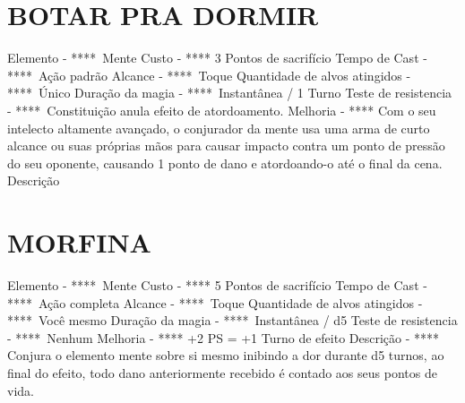 \documentclass{article}%
\begin{document}
\section{BOTAR PRA DORMIR}%
\label{sec:BOTARPRADORMIR}%
Elemento {-} ****~Mente\newline%
Custo {-} **** 3 Pontos de sacrifício\newline%
Tempo de Cast {-} ****~Ação padrão\newline%
Alcance {-} ****~Toque\newline%
Quantidade de alvos atingidos {-} ****~Único\newline%
Duração da magia {-} ****~Instantânea / 1 Turno\newline%
Teste de resistencia {-} ****~Constituição anula efeito de atordoamento.\newline%
Melhoria {-} **** Com o seu intelecto altamente avançado, o conjurador da mente usa uma arma de curto alcance ou suas próprias mãos para causar impacto contra um ponto de pressão do seu oponente, causando 1 ponto de dano e atordoando{-}o até o final da cena.\newline%
Descrição \newline%

%
\section{MORFINA}%
\label{sec:MORFINA}%
Elemento {-} ****~Mente\newline%
Custo {-} **** 5 Pontos de sacrifício\newline%
Tempo de Cast {-} ****~Ação completa\newline%
Alcance {-} ****~Toque\newline%
Quantidade de alvos atingidos {-} ****~Você mesmo\newline%
Duração da magia {-} ****~Instantânea / d5\newline%
Teste de resistencia {-} ****~Nenhum\newline%
Melhoria {-} **** +2 PS = +1 Turno de efeito\newline%
Descrição {-} **** Conjura o elemento mente sobre si mesmo inibindo a dor durante d5 turnos, ao final do efeito, todo dano anteriormente recebido é contado aos seus pontos de vida.\newline%

%
\end{document}
